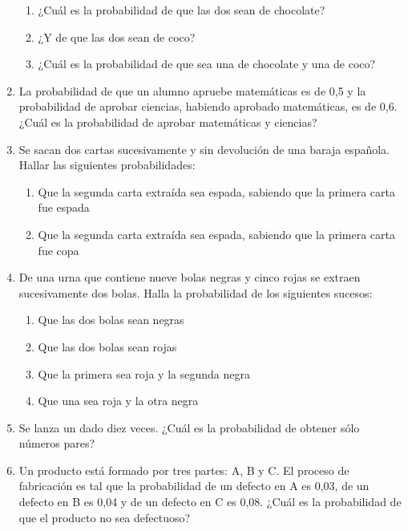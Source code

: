\documentclass[letterpaper]{article}
\begin{document}
\begin{multicols}{2}
\begin{enumerate}
\begin{enumerate}
\item ¿Cuál es la probabilidad de que las dos sean de chocolate?
\item ¿Y de que las dos sean de coco?
\item ¿Cuál es la probabilidad de que sea una de chocolate y una de coco?
\end{enumerate}
\item La probabilidad de que un alumno apruebe matemáticas es de 0,5 y la probabilidad de aprobar ciencias, habiendo aprobado matemáticas, es de 0,6. ¿Cuál es la probabilidad de aprobar matemáticas y ciencias?
\item Se sacan dos cartas sucesivamente y sin devolución de una baraja española. Hallar las siguientes probabilidades:
\begin{enumerate}
\item Que la segunda carta extraída sea espada, sabiendo que la primera carta fue espada
\item Que la segunda carta extraída sea espada, sabiendo que la primera carta fue copa
\end{enumerate}
\item De una urna que contiene nueve bolas negras y cinco rojas se extraen sucesivamente dos bolas. Halla la probabilidad de los siguientes sucesos:
\begin{enumerate}
\item Que las dos bolas sean negras
\item Que las dos bolas sean rojas
\item Que la primera sea roja y la segunda negra
\item Que una sea roja y la otra negra
\end{enumerate}
\item Se lanza un dado diez veces. ¿Cuál es la probabilidad de obtener sólo números pares?
\item Un producto está formado por tres partes: A, B y C. El proceso de fabricación es tal
que la probabilidad de un defecto en A es 0,03, de un defecto en B es 0,04 y de un defecto en C es 0,08. ¿Cuál es la probabilidad de que el producto no sea defectuoso?
\end{enumerate}
\end{multicols}
\end{document}
